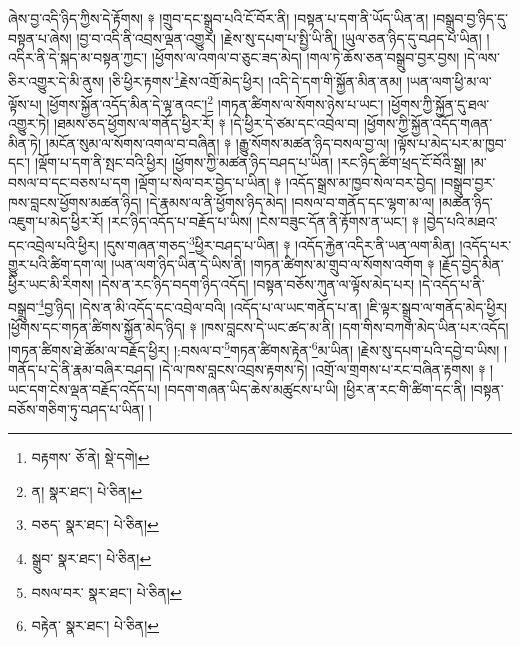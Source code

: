 ཞེས་བྱ་འདི་ཉིད་ཀྱིས་དེ་རྟོགས། ༈ །གྲུབ་དང་སྒྲུབ་པའི་ངོ་བོར་ནི། །བསྟན་པ་དག་ནི་ཡོད་ཡིན་ན། །བསྒྲུབ་བྱ་ཉིད་དུ་བསྟན་པ་ཞེས། །བྱ་བ་འདི་ནི་འབྲས་ལྡན་འགྱུར། །རྗེས་སུ་དཔག་པ་སྤྱི་ཡི་ནི། །ཡུལ་ཅན་ཉིད་དུ་བཤད་པ་ཡིན། །འདིར་ནི་དེ་སྐད་མ་བསྟན་ཀྱང་། །ཕྱོགས་ལ་འགལ་བ་ཅུང་ཟད་མེད། །གལ་ཏེ་ཆོས་ཅན་བསྒྲུབ་བྱར་བྱས། །དེ་ལས་ཅིར་འགྱུར་དེ་མི་ནུས། །ཅི་ཕྱིར་རྟགས་\footnote{བརྟགས་  ཅོ་ནེ།  སྡེ་དགེ། }རྗེས་འགྲོ་མེད་ཕྱིར། །འདི་དེ་དག་གི་སྐྱོན་མིན་ནམ། །ཡན་ལག་ཕྱི་མ་ལ་ལྟོས་པ། །ཕྱོགས་སྐྱོན་འདོད་མིན་དེ་ལྟ་ནའང་།\footnote{ན།  སྣར་ཐང་།  པེ་ཅིན། } །གཏན་ཚིགས་ལ་སོགས་ཉེས་པ་ཡང་། །ཕྱོགས་ཀྱི་སྐྱོན་དུ་ཐལ་འགྱུར་ཏེ། །ཐམས་ཅད་ཕྱོགས་ལ་གནོད་ཕྱིར་རོ། ༈ །དེ་ཕྱིར་དེ་ཙམ་དང་འབྲེལ་བ། །ཕྱོགས་ཀྱི་སྐྱོན་འདོད་གཞན་མིན་ཏེ། །མངོན་སུམ་ལ་སོགས་འགལ་བ་བཞིན། ༈ །རྒྱུ་སོགས་མཚན་ཉིད་བསལ་བྱ་ལ། །ལྟོས་པ་མེད་པར་མ་ཁྱབ་དང་། །ལྡོག་པ་དག་ནི་སྤང་བའི་ཕྱིར། །ཕྱོགས་ཀྱི་མཚན་ཉིད་བཤད་པ་ཡིན། །རང་ཉིད་ཚིག་ཕྲད་ངོ་བོའི་སྒྲ། །མ་བསལ་བ་དང་བཅས་པ་དག །ལྡོག་པ་སེལ་བར་བྱེད་པ་ཡིན། ༈ །འདོད་སྒྲས་མ་ཁྱབ་སེལ་བར་བྱེད། །བསྒྲུབ་བྱར་ཁས་བླངས་ཕྱོགས་མཚན་ཉིད། །དེ་རྣམས་ལ་ནི་ཕྱོགས་ཉིད་མེད། །བསལ་བ་གནོད་དང་ལྷག་མ་ལ། །མཚན་ཉིད་འཇུག་པ་མེད་ཕྱིར་རོ། །རང་ཉིད་འདོད་པ་བརྗོད་པ་ཡིས། །ངེས་བཟུང་དོན་ནི་རྟོགས་ན་ཡང་། ༈ །བྱེད་པའི་མཐའ་དང་འབྲེལ་པའི་ཕྱིར། །དུས་གཞན་གཅད་\footnote{བཅད་  སྣར་ཐང་།  པེ་ཅིན། }ཕྱིར་བཤད་པ་ཡིན། ༈ །འདོད་རྐྱེན་འདིར་ནི་ཡན་ལག་མིན། །འདོད་པར་གྱུར་པའི་ཚིག་དག་ལ། །ཡན་ལག་ཉིད་ཡིན་དེ་ཡིས་ནི། །གཏན་ཚིགས་མ་གྲུབ་ལ་སོགས་འགོག ༈ །རྗོད་བྱེད་མིན་ཕྱིར་ཡང་མི་རིགས། །དེས་ན་རང་ཉིད་བདག་ཉིད་འདོད། །བསྟན་བཅོས་ཀུན་ལ་ལྟོས་མེད་པར། །དེ་འདོད་པ་ནི་བསྒྲུབ་\footnote{སྒྲུབ་  སྣར་ཐང་།  པེ་ཅིན། }བྱ་ཉིད། །དེས་ན་མི་འདོད་དང་འབྲེལ་བའི། །འདོད་པ་ལ་ཡང་གནོད་པ་ན། །ཇི་ལྟར་སྒྲུབ་ལ་གནོད་མེད་ཕྱིར། །ཕྱོགས་དང་གཏན་ཚིགས་སྐྱོན་མེད་ཉིད། ༈ །ཁས་བླངས་དེ་ཡང་ཚད་མ་ནི། །དག་གིས་བཀག་མེད་ཡིན་པར་འདོད། །གཏན་ཚིགས་ཐེ་ཚོམ་ལ་བརྗོད་ཕྱིར། །:བསལ་བ་\footnote{བསལ་བར་  སྣར་ཐང་།  པེ་ཅིན། }གཏན་ཚིགས་རྟེན་\footnote{བརྟེན་  སྣར་ཐང་།  པེ་ཅིན། }མ་ཡིན། །རྗེས་སུ་དཔག་པའི་དབྱེ་བ་ཡིས། །གནོད་པ་དེ་ནི་རྣམ་བཞིར་བཤད། །དེ་ལ་ཁས་བླངས་འབྲས་རྟགས་ཏེ། །འགྲོ་ལ་གྲགས་པ་རང་བཞིན་རྟགས། ༈ །ཡང་དག་ངེས་ལྡན་བརྗོད་འདོད་པ། །བདག་གཞན་ཡིད་ཆེས་མཚུངས་པ་ཡི། །ཕྱིར་ན་རང་གི་ཚིག་དང་ནི། །བསྟན་བཅོས་གཅིག་ཏུ་བཤད་པ་ཡིན། །
